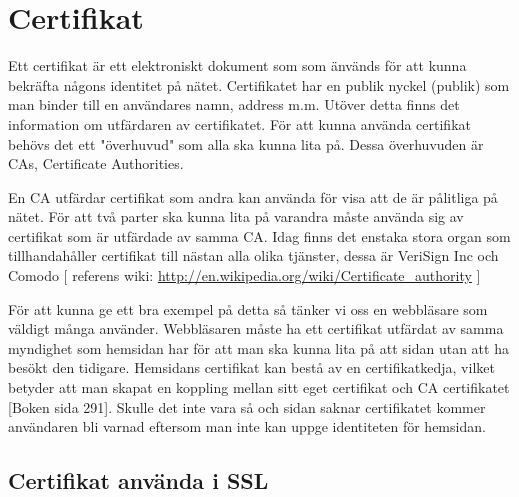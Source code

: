 \section{Certifikat}
Ett certifikat är ett elektroniskt dokument som som änvänds för att kunna bekräfta någons identitet på nätet. Certifikatet har en publik nyckel (publik) som man binder till en användares namn, address m.m. 
Utöver detta finns det information om utfärdaren av certifikatet. 
För att kunna använda certifikat behövs det ett "överhuvud" som alla ska kunna lita på. 
Dessa överhuvuden är CAs, Certificate Authorities. 

En CA utfärdar certifikat som andra kan använda för visa att de är pålitliga på nätet. För att två parter ska kunna lita på varandra måste använda sig av certifikat som är utfärdade av samma CA. Idag finns det enstaka stora organ som tillhandahåller certifikat till nästan alla olika tjänster, dessa är VeriSign Inc och Comodo  [ referens wiki: \url{http://en.wikipedia.org/wiki/Certificate_authority} ]

För att kunna ge ett bra exempel på detta så tänker vi oss en webbläsare som väldigt många använder. Webbläsaren måste ha ett certifikat utfärdat av samma myndighet som hemsidan har för att man ska kunna lita på att sidan utan att ha besökt den tidigare. Hemsidans certifikat kan bestå av en certifikatkedja, vilket betyder att man skapat en koppling mellan sitt eget certifikat och CA certifikatet [Boken sida 291]. Skulle det inte vara så och sidan saknar certifikatet kommer användaren bli varnad eftersom man inte kan uppge identiteten för hemsidan.

\subsection{Certifikat använda i SSL}
